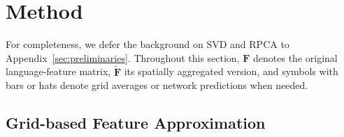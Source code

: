 \documentclass[10pt,twocolumn,letterpaper]{article}
\begin{document}
\section{Method}
\label{sec:method}
For completeness, we defer the background on SVD and RPCA to Appendix~\ref{sec:preliminaries}. Throughout this section, $\mathbf{F}$ denotes the original language-feature matrix, $\tilde{\mathbf{F}}$ its spatially aggregated version, and symbols with bars or hats denote grid averages or network predictions when needed.

\subsection{Grid-based Feature Approximation}
\begin{table}[tb]
  \caption{Analysis of feature similarity within grids on the LERF and 3DOVS datasets. We compute metrics such as L1, L2 distance, and cosine similarity for both the original 768-dim SceneSplat language features and the corresponding features compressed to 16 dimensions via SVD. High similarity is consistently observed within grids across all scenes, indicating substantial spatial redundancy in the language feature matrix.}
  \label{tab:gridsim}
  \centering
\end{table}
\end{document}
